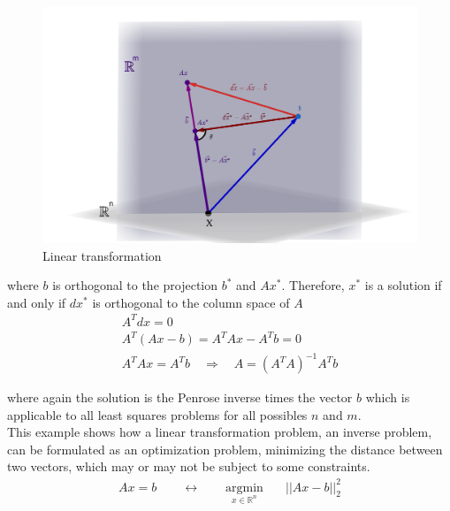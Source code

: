 \begin{minipage}{0.5\linewidth}
\begin{figure}[H]
    \centering
    \includegraphics[width=\linewidth]{Images/linear_transformation.png}
    \caption{Linear transformation}
    \label{fig:linear_transformation}
\end{figure}
\end{minipage}\hspace{20pt}
\begin{minipage}{0.45\linewidth}

where $b$ is orthogonal to the projection $b^*$ and $Ax^*$. Therefore, $x^*$ is a solution if and only if $dx^*$ is orthogonal to the column space of $A$ 
\begin{gather*}
    A^Tdx = 0 \\ 
    A^T (Ax-b) = A^TAx-A^Tb = 0 \\
    A^TAx = A^Tb  \quad \Rightarrow \quad A = (A^TA)^{-1}A^T b
\end{gather*}
\end{minipage}

\vspace{10pt}

where again the solution is the Penrose inverse times the vector $b$ which is applicable to all least squares problems for all possibles $n$ and $m$.\\

This example shows how a linear transformation problem, an inverse problem, can be formulated as an optimization problem, minimizing the distance between two vectors, which may or may not be subject to some constraints.
\begin{align*}
    Ax = b \qquad \leftrightarrow \qquad \underset{ x \in \mathbb{R}^n}{\text{argmin}} &\quad   ||Ax-b||_2^2
\end{align*}




